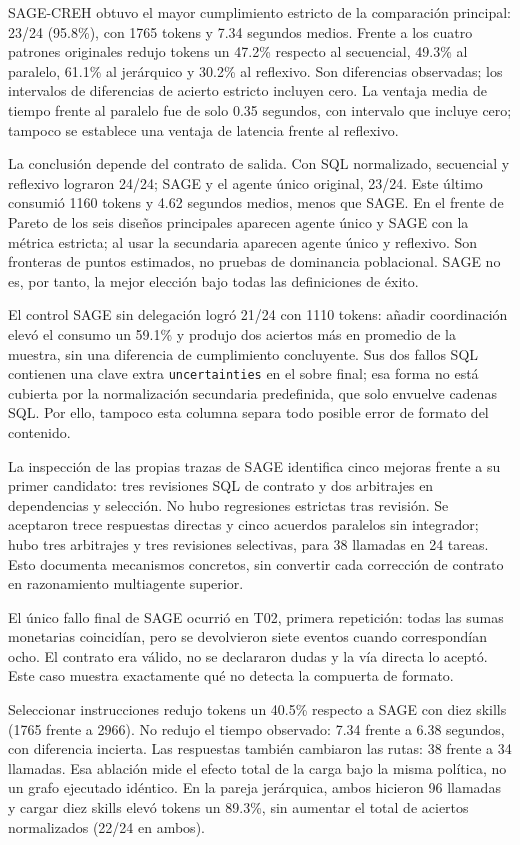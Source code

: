 SAGE-CREH obtuvo el mayor cumplimiento estricto de la comparación principal:
23/24 (95.8\%), con 1765 tokens y 7.34 segundos medios. Frente a los cuatro
patrones originales redujo tokens un 47.2\% respecto al secuencial, 49.3\% al
paralelo, 61.1\% al jerárquico y 30.2\% al reflexivo. Son diferencias observadas;
los intervalos de diferencias de acierto estricto incluyen cero. La ventaja media
de tiempo frente al paralelo fue de solo 0.35 segundos, con intervalo que incluye
cero; tampoco se establece una ventaja de latencia frente al reflexivo.

La conclusión depende del contrato de salida. Con SQL normalizado, secuencial y
reflexivo lograron 24/24; SAGE y el agente único original, 23/24. Este último
consumió 1160 tokens y 4.62 segundos medios, menos que SAGE. En el frente de Pareto
de los seis diseños principales aparecen agente único y SAGE con la métrica
estricta; al usar la secundaria aparecen agente único y reflexivo. Son fronteras
de puntos estimados, no pruebas de dominancia poblacional. SAGE no es, por tanto,
la mejor elección bajo todas las definiciones de éxito.

El control SAGE sin delegación logró 21/24 con 1110 tokens: añadir coordinación
elevó el consumo un 59.1\% y produjo dos aciertos más en promedio de la muestra,
sin una diferencia de cumplimiento concluyente. Sus dos fallos SQL contienen
una clave extra \texttt{uncertainties} en el sobre final; esa forma no está cubierta
por la normalización secundaria predefinida, que solo envuelve cadenas SQL.
Por ello, tampoco esta columna separa todo posible error de formato del contenido.

La inspección de las propias trazas de SAGE identifica cinco mejoras frente a su
primer candidato: tres revisiones SQL de contrato y dos arbitrajes en dependencias
y selección. No hubo regresiones estrictas tras revisión. Se aceptaron trece
respuestas directas y cinco acuerdos paralelos sin integrador; hubo tres arbitrajes
y tres revisiones selectivas, para 38 llamadas en 24 tareas. Esto documenta
mecanismos concretos, sin convertir cada corrección de contrato en razonamiento
multiagente superior.

El único fallo final de SAGE ocurrió en T02, primera repetición: todas las sumas
monetarias coincidían, pero se devolvieron siete eventos cuando correspondían
ocho. El contrato era válido, no se declararon dudas y la vía directa lo aceptó.
Este caso muestra exactamente qué no detecta la compuerta de formato.

Seleccionar instrucciones redujo tokens un 40.5\% respecto a SAGE con diez skills
(1765 frente a 2966). No redujo el tiempo observado: 7.34 frente a 6.38 segundos,
con diferencia incierta. Las respuestas también cambiaron las rutas: 38 frente
a 34 llamadas. Esa ablación mide el efecto total de la carga bajo la misma
política, no un grafo ejecutado idéntico. En la pareja jerárquica, ambos hicieron
96 llamadas y cargar diez skills elevó tokens un 89.3\%, sin aumentar el total
de aciertos normalizados (22/24 en ambos).

